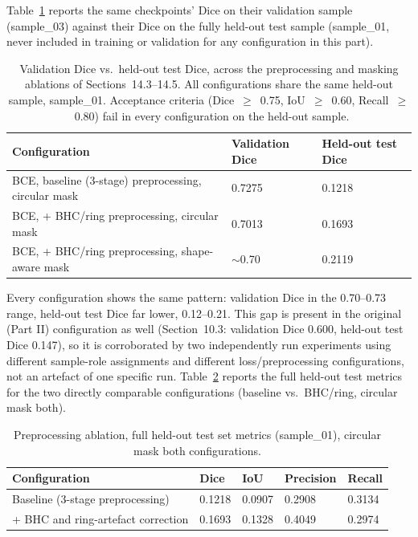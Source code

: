 Table~\ref{tab:generalisation_gap} reports the same checkpoints' Dice on their validation sample
(sample\_03) against their Dice on the fully held-out test sample (sample\_01, never included in
training or validation for any configuration in this part).

\begin{table}[htbp]
\centering
\caption{Validation Dice vs.\ held-out test Dice, across the preprocessing and masking ablations of
  Sections~14.3--14.5. All configurations share the same held-out sample, sample\_01. Acceptance
  criteria (Dice~$\geq$~0.75, IoU~$\geq$~0.60, Recall~$\geq$~0.80) fail in every configuration on the
  held-out sample.}
\label{tab:generalisation_gap}
\small
\begin{tabular}{p{7.8cm}p{3.2cm}p{3.2cm}}
\toprule
\textbf{Configuration} & \textbf{Validation Dice} & \textbf{Held-out test Dice} \\
\midrule
BCE, baseline (3-stage) preprocessing, circular mask & 0.7275 & 0.1218 \\
BCE, + BHC/ring preprocessing, circular mask         & 0.7013 & 0.1693 \\
BCE, + BHC/ring preprocessing, shape-aware mask       & $\sim$0.70 & 0.2119 \\
\bottomrule
\end{tabular}
\end{table}

Every configuration shows the same pattern: validation Dice in the 0.70--0.73 range, held-out test
Dice far lower, 0.12--0.21. This gap is present in the original (Part II) configuration as well
(Section~10.3: validation Dice 0.600, held-out test Dice 0.147), so it is corroborated by two
independently run experiments using different sample-role assignments and different loss/preprocessing
configurations, not an artefact of one specific run. Table~\ref{tab:preproc_ablation} reports the full
held-out test metrics for the two directly comparable configurations (baseline vs.\ BHC/ring,
circular mask both).

\begin{table}[htbp]
\centering
\caption{Preprocessing ablation, full held-out test set metrics (sample\_01), circular mask both
  configurations.}
\label{tab:preproc_ablation}
\begin{tabular}{lllll}
\toprule
\textbf{Configuration} & \textbf{Dice} & \textbf{IoU} & \textbf{Precision} & \textbf{Recall} \\
\midrule
Baseline (3-stage preprocessing) & 0.1218 & 0.0907 & 0.2908 & 0.3134 \\
+ BHC and ring-artefact correction & 0.1693 & 0.1328 & 0.4049 & 0.2974 \\
\bottomrule
\end{tabular}
\end{table}

